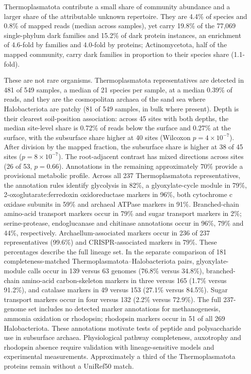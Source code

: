 \documentclass[11pt]{article}
\begin{document}
Thermoplasmatota contribute a small share of community abundance and a larger share of the
attributable unknown repertoire. They are 4.4\%
of species and 0.8\% of mapped reads (median across samples), yet carry 19.8\% of the 77{,}069
single-phylum dark families and 15.2\% of dark protein instances, an enrichment of 4.6-fold by
families and 4.0-fold by proteins; Actinomycetota, half of the mapped community, carry dark families
in proportion to their species share (1.1-fold).

These are not rare organisms. Thermoplasmatota representatives are detected in 481 of 549 samples,
a median of 21 species per sample, at a median 0.39\% of reads, and they are the cosmopolitan archaea
of the sand sea where Halobacteriota are patchy (81 of 549 samples, in bulk where present). Depth is
their clearest soil-position association: across 45 sites with both depths, the median site-level
share is 0.72\% of reads below the surface and 0.27\% at the surface, with the subsurface share
higher at 40 sites (Wilcoxon $p = 4 \times 10^{-7}$). After division by the mapped fraction,
the subsurface share is higher at 38 of 45 sites ($p = 8 \times 10^{-7}$).
The root-adjacent contrast has mixed directions across sites (26 of 53, $p = 0.66$).
Annotations in the remaining approximately 70\% provide a provisional metabolic profile.
Across all 237 Thermoplasmatota representatives, the annotation rules identify glycolysis in
82\%, a glyoxylate-cycle module in 79\%, 2-oxoglutarate:ferredoxin oxidoreductase markers in 96\%,
both cytochrome c oxidase subunits in 59\% and archaeal ATPase markers in 91\%.
Branched-chain amino-acid transport markers occur in 79\% and sugar transport markers in 2\%;
serine-protease, endoglucanase and chitinase annotations occur in 96\%, 79\% and 44\%, respectively.
Archaellum-associated markers occur in 236 of 237 representatives (99.6\%) and CRISPR-associated
markers in 79\%. These percentages describe the full lineage set. In the separate comparison
of 181 completeness-matched Thermoplasmatota--Halobacteriota pairs, glyoxylate-module calls occur
in 139 versus 63 genomes (76.8\% versus 34.8\%), branched-chain amino-acid carbon-skeleton
markers in three versus 165 (1.7\% versus 91.2\%), and catalase markers in 49 versus 153
(27.1\% versus 84.5\%). Sugar transport markers occur in four versus 132 (2.2\% versus 72.9\%).
The full 237-genome set includes no detected marker annotations for methanogenesis,
ammonia oxidation or rhodopsin; rhodopsin markers occur in 51 of all 269 Halobacteriota.
These annotations motivate tests of peptide and polysaccharide use in subsurface archaea.
Physiological pathway completeness, auxotrophy and rhodopsin absence require validation with
lineage-sensitive models and experimental measurements. Approximately a third of the
Thermoplasmatota proteins remain without a UniRef50 match.
\end{document}
